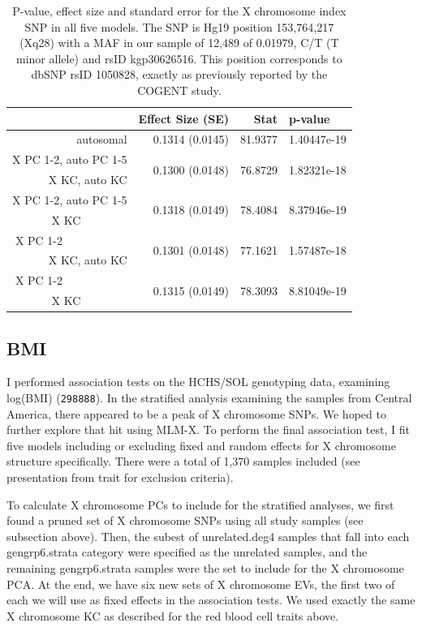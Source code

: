 \documentclass[11pt]{article} %
\begin{document}
\begin{table}[ht]
\centering
\begin{tabular}{rrrl}
  \hline
 & Effect Size (SE) & Stat & p-value \\ 
  \hline
autosomal & 0.1314 (0.0145) & 81.9377 & 1.40447e-19 \\ \hline
X PC 1-2, auto PC 1-5 & \multirow{2}{*}{0.1300 (0.0148)} & \multirow{2}{*}{76.8729} & \multirow{2}{*}{1.82321e-18} \\ 
X KC, auto KC & & &\\ \hline
X PC 1-2, auto PC 1-5  & \multirow{2}{*}{0.1318 (0.0149)} & \multirow{2}{*}{78.4084} & \multirow{2}{*}{8.37946e-19} \\ 
X KC \textcolor{white}{auto KC} & &&\\ \hline
X PC 1-2 \textcolor{white}{auto PC 1-5}  & \multirow{2}{*}{0.1301 (0.0148)} & \multirow{2}{*}{77.1621} & \multirow{2}{*}{1.57487e-18} \\ 
X KC, auto KC & & &\\ \hline 
X PC 1-2 \textcolor{white}{auto PC 1-5} & \multirow{2}{*}{0.1315 (0.0149)} & \multirow{2}{*}{78.3093} & \multirow{2}{*}{8.81049e-19} \\ 
X KC \textcolor{white}{auto KC} & & & \\   \hline
\end{tabular}
\caption{P-value, effect size and standard error for the X chromosome index SNP in all five models. The SNP is Hg19 position 153,764,217 (Xq28) with a MAF in our sample of 12,489 of 0.01979, C/T (T minor allele) and rsID kgp30626516. This position corresponds to dbSNP rsID 1050828, exactly as previously reported by the COGENT study.}
\end{table}


\subsection*{BMI}
I performed association tests on the HCHS/SOL genotyping data, examining log(BMI) (\texttt{298888}). 
In the stratified analysis examining the samples from Central America, there appeared to be a peak of X chromosome SNPs. We hoped to further explore that hit using MLM-X.
To perform the final association test, I fit five models including or excluding fixed and random effects for X chromosome structure specifically. There were a total of 1,370 samples included (see presentation from trait for exclusion criteria).

To calculate X chromosome PCs to include for the stratified analyses, we first found a pruned set of X chromosome SNPs using all study samples (see subsection above).
Then, the subest of unrelated.deg4 samples that fall into each gengrp6.strata category were specified as the unrelated samples, and the remaining gengrp6.strata samples were the set to include for the X chromosome PCA. At the end, we have six new sets of X chromosome EVs, the first two of each we will use as fixed effects in the association tests.
We used exactly the same X chromosome KC as described for the red blood cell traits above.
\end{document}
